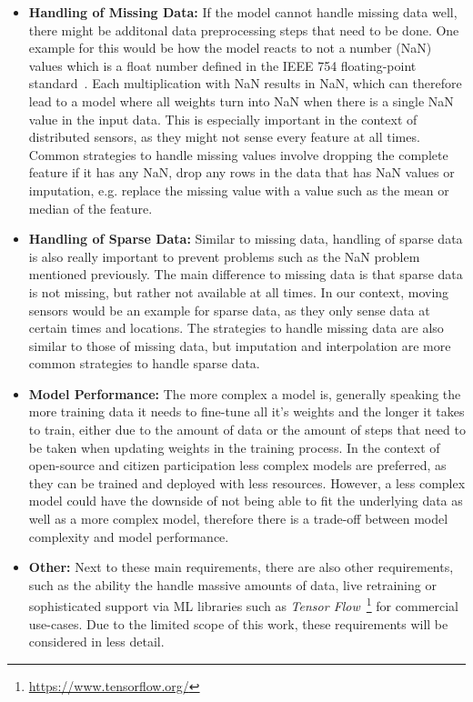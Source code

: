 \begin{itemize}
    \item \textbf{Handling of Missing Data:} If the model cannot handle missing data well, there might be additonal data preprocessing steps that need to be done. One example for this would be how the model reacts to not a number (NaN) values which is a float number defined in the IEEE 754 floating-point standard~\cite{ieee754}. Each multiplication with NaN results in NaN, which can therefore lead to a model where all weights turn into NaN when there is a single NaN value in the input data. This is especially important in the context of distributed sensors, as they might not sense every feature at all times. Common strategies to handle missing values involve dropping the complete feature if it has any NaN, drop any rows in the data that has NaN values or imputation, e.g. replace the missing value with a value such as the mean or median of the feature.
    \item \textbf{Handling of Sparse Data:} Similar to missing data, handling of sparse data is also really important to prevent problems such as the NaN problem mentioned previously. The main difference to missing data is that sparse data is not missing, but rather not available at all times. In our context, moving sensors would be an example for sparse data, as they only sense data at certain times and locations. The strategies to handle missing data are also similar to those of missing data, but imputation and interpolation are more common strategies to handle sparse data.
    \item \textbf{Model Performance:} The more complex a model is, generally speaking the more training data it needs to fine-tune all it's weights and the longer it takes to train, either due to the amount of data or the amount of steps that need to be taken when updating weights in the training process. In the context of open-source and citizen participation less complex models are preferred, as they can be trained and deployed with less resources. However, a less complex model could have the downside of not being able to fit the underlying data as well as a more complex model, therefore there is a trade-off between model complexity and model performance.
    \item \textbf{Other:} Next to these main requirements, there are also other requirements, such as the ability the handle massive amounts of data, live retraining or sophisticated support via ML libraries such as \textit{Tensor Flow}~\footnote{\url{https://www.tensorflow.org/}} for commercial use-cases. Due to the limited scope of this work, these requirements will be considered in less detail.
\end{itemize}

